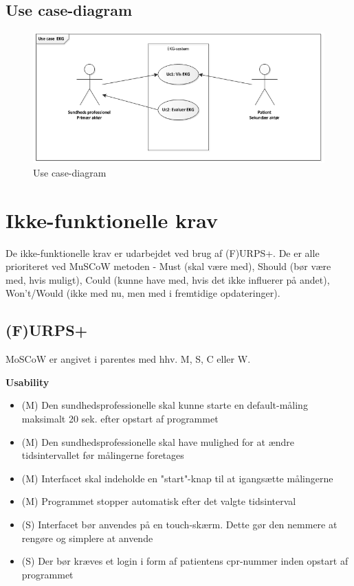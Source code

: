 \subsection{Use case-diagram}

\begin{figure}[htb]
	\centering
	\includegraphics[width=1\textwidth]{Figurer/Snip20150226_2}
	\caption{Use case-diagram}
	\label{fig:Use Cases}
\end{figure}

\section{Ikke-funktionelle krav}
De ikke-funktionelle krav er udarbejdet ved brug af (F)URPS+. De er alle prioriteret ved MuSCoW metoden - Must (skal være med), Should (bør være med, hvis muligt), Could (kunne have med, hvis det ikke influerer på andet), Won't/Would (ikke med nu, men med i fremtidige opdateringer). 

\subsection{(F)URPS+}
MoSCoW er angivet i parentes med hhv. M, S, C eller W.

\textbf{Usability}
\begin{itemize}
	\item (M) Den sundhedsprofessionelle skal kunne starte en default-måling maksimalt 20 sek. efter opstart af programmet
	\item (M) Den sundhedsprofessionelle skal have mulighed for at ændre tidsintervallet før målingerne foretages
	\item (M) Interfacet skal indeholde en "start"-knap til at igangsætte målingerne
	\item (M) Programmet stopper automatisk efter det valgte tidsinterval
	\item (S) Interfacet bør anvendes på en touch-skærm. Dette gør den nemmere at rengøre og simplere at anvende
	\item (S) Der bør kræves et login i form af patientens cpr-nummer inden opstart af programmet
\end{itemize}

